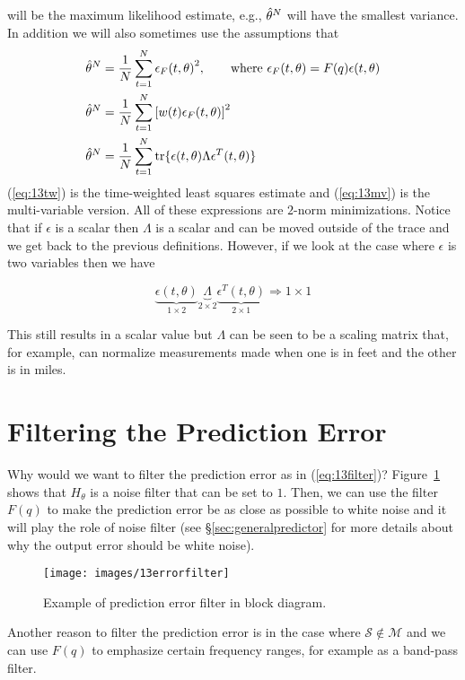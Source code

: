 will be the maximum likelihood estimate, e.g., $\hat{\theta}^N$ will have the smallest variance.
In addition we will also sometimes use the assumptions that
\begin{align}
\label{eq:13filter}
\hat{\theta}^N &= \frac{1}{N}\sum_{t=1}^N\epsilon_F{(t,\theta)}^2, \qquad \text{where } \epsilon_F(t,\theta)=F(q)\epsilon(t,\theta) \\
\label{eq:13tw}
  \hat{\theta}^N &= \frac{1}{N}\sum_{t=1}^N{\left[w(t)\epsilon_F(t,\theta)\right]}^2 \\
\label{eq:13mv}
\hat{\theta}^N &= \frac{1}{N}\sum_{t=1}^N\text{tr}\{\epsilon(t,\theta)\Lambda\epsilon^T(t,\theta)\}
\end{align}
(\ref{eq:13tw}) is the time-weighted least squares estimate and (\ref{eq:13mv}) is the multi-variable version.
All of these expressions are $2$-norm minimizations.
Notice that if $\epsilon$ is a scalar then $\Lambda$ is a scalar and can be moved outside of the trace and we get back to the previous definitions.
However, if we look at the case where $\epsilon$ is two variables then we have

\begin{equation*}
\underbrace{\epsilon(t,\theta)}_{1\times2}\underbrace{\Lambda}_{2\times2}\underbrace{\epsilon^T(t,\theta)}_{2\times1}\Rightarrow1\times1
\end{equation*}

This still results in a scalar value but $\Lambda$ can be seen to be a scaling matrix that, for example, can normalize measurements made when one is in feet and the other is in miles.

\section{Filtering the Prediction Error}
Why would we want to filter the prediction error as in (\ref{eq:13filter})? Figure~\ref{fig:13errorfilter} shows that $H_\theta$ is a noise filter that can be set to $1$.
Then, we can use the filter $F(q)$ to make the prediction error be as close as possible to white noise and it will play the role of noise filter (see \S\ref{sec:generalpredictor} for more details about why the output error should be white noise).

\begin{figure}[ht!]
\centering
\texttt{[image: images/13errorfilter]}
\caption{Example of prediction error filter in block diagram.}%
\label{fig:13errorfilter}
\end{figure}

Another reason to filter the prediction error is in the case where $\mathcal{S}\notin\mathcal{M}$ and we can use $F(q)$ to emphasize certain frequency ranges, for example as a band-pass filter.

